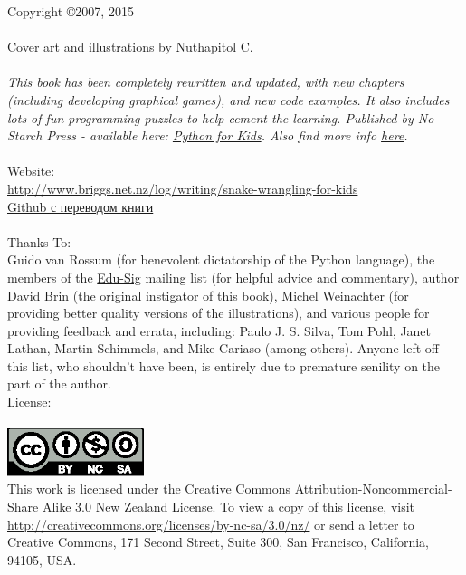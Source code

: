 Copyright \copyright 2007, 2015\\
\\
Cover art and illustrations by Nuthapitol C.\\
\\
\noindent
\textsf{\emph{This book has been completely rewritten and updated, with new chapters (including developing graphical games), and new code examples. It also includes lots of fun programming puzzles to help cement the learning. Published by No Starch Press - available here: \href{http://nostarch.com/pythonforkids}{Python for Kids}. Also find more info \href{http://jasonrbriggs.com/python-for-kids/}{here}.}}
\\
\\
\linebreak
\noindent
Website:\\ \href{http://www.briggs.net.nz/log/writing/snake-wrangling-for-kids}{http://www.briggs.net.nz/log/writing/snake-wrangling-for-kids}\\
\href{https://github.com/gluk47/swfk/tree/master/ru}{Github с переводом книги}\\
\\
\noindent
Thanks To:\\
Guido van Rossum (for benevolent dictatorship of the Python language), the members of the \href{http://www.python.org/community/sigs/current/edu-sig/}{Edu-Sig} mailing list (for helpful advice and commentary), author \href{http://www.davidbrin.com/}{David Brin} (the original \href{http://www.salon.com/tech/feature/2006/09/14/basic/}{instigator} of this book), Michel Weinachter (for providing better quality versions of the illustrations), and various people for providing feedback and errata, including: Paulo J. S. Silva, Tom Pohl, Janet Lathan, Martin Schimmels, and Mike Cariaso (among others).  Anyone left off this list, who shouldn't have been, is entirely due to premature senility on the part of the author.\\

\noindent
License:\\
\\
\includegraphics[width=40mm]{../en/by-nc-sa.eps}\\
This work is licensed under the Creative Commons Attribution-Noncommercial-Share Alike 3.0 New Zealand License. To view a copy of this license, visit\\ \href{http://creativecommons.org/licenses/by-nc-sa/3.0/nz/}{http://creativecommons.org/licenses/by-nc-sa/3.0/nz/} or send a letter to Creative Commons, 171 Second Street, Suite 300, San Francisco, California, 94105, USA.\\

